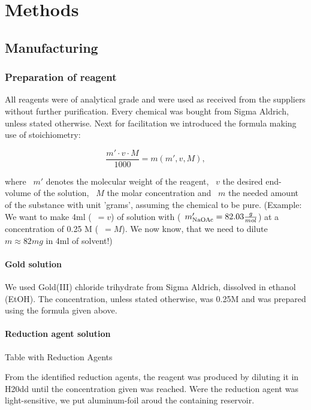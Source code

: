 \section{Methods}

\subsection{Manufacturing}

\subsubsection{Preparation of reagent}

All reagents were of analytical grade and were used as received from the suppliers without further purification. Every chemical was bought from Sigma Aldrich, unless stated otherwise. 
Next for facilitation we introduced the formula making use of stoichiometry:

    $$\frac{m'\cdot v\cdot M}{1000} = m(m',v,M), $$

where ~$m'$ denotes the molecular weight of the reagent, ~$v$ the desired end-volume of the solution, ~$M$ the molar concentration and ~$m$ the needed amount of the substance with unit 'grams', assuming the chemical to be pure. (Example: We want to make 4ml (~$= v$) of solution with  (~$m'_{\ce{NaOAc}}= 82.03 \frac{g}{mol}$) at a concentration of 0.25 M (~$= M$). We now know, that we need to dilute $m \approx 82mg$  in 4ml of solvent!) 

\newpage 


\paragraph{Gold solution}

We used Gold(III) chloride trihydrate from Sigma Aldrich, dissolved in ethanol (EtOH). The concentration, unless stated otherwise, was 0.25M and was prepared using the formula given above.


\paragraph{Reduction agent solution}


\color[red]{TODO} Table with Reduction Agents

From the identified reduction agents, the reagent was produced by diluting it in H20dd until the concentration given was reached. Were the reduction agent was light-sensitive, we put aluminum-foil aroud the containing reservoir.

